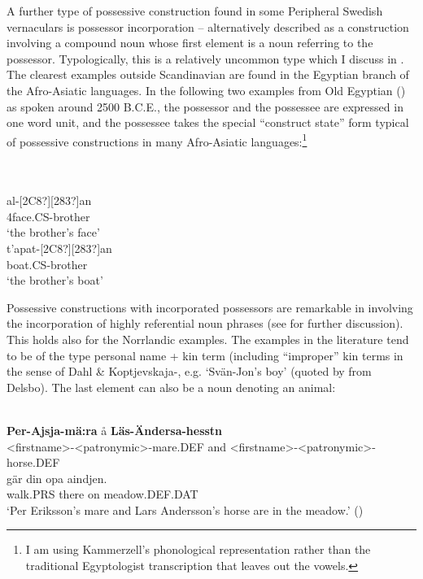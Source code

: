 A further type of possessive construction found in some Peripheral Swedish vernaculars is possessor incorporation – alternatively described as a construction involving a compound noun whose first element is a noun referring to the possessor. Typologically, this is a relatively uncommon type which I discuss in \citet{Dahl2004}. The clearest examples outside Scandinavian are found in the Egyptian branch of the Afro-Asiatic languages. In the following two examples from Old Egyptian (\citet{Kammerzell2000}) as spoken around 2500 B.C.E., the possessor and the possessee are expressed in one word unit, and the possessee takes the special “construct state” form typical of possessive constructions in many Afro-Asiatic languages:\footnote{ I am using Kammerzell’s phonological representation rather than the traditional Egyptologist transcription that leaves out the vowels.}

\ea
{}\\
\ea
{}\\
\gll [127?]al-[2C8?][283?]an\\
4face.CS-brother\\
\glt ‘the brother’s face’  
\ex
{}\\
\gll t’apat-[2C8?][283?]an\\
boat.CS-brother\\
\glt ‘the brother’s boat’
\z
\z

Possessive constructions with incorporated possessors are remarkable in involving the incorporation of highly referential noun phrases (see \citet{Dahl2004} for further discussion). This holds also for the Norrlandic examples. The examples in the literature tend to be of the type personal name + kin term (including “improper” kin terms in the sense of Dahl \& Koptjevskaja-\citet{Tamm2001}, e.g.  ‘Svän-Jon’s boy’ (quoted by \citet[38]{Delsing2003a} from Delsbo). The last element can also be a noun denoting an animal:

\ea\label{}
\\
\gll \textbf{Per-Ajsja-mä:ra} å  \textbf{Läs-Ändersa-hesstn}\\
{\textless}firstname{\textgreater}-{\textless}patronymic{\textgreater}-mare.DEF  and  {\textless}firstname{\textgreater}-{\textless}patronymic{\textgreater}-horse.DEF\\
\gll gär  din  opa  aindjen.\\
walk.PRS  there  on  meadow.DEF.DAT\\
\glt ‘Per Eriksson’s mare and Lars Andersson’s horse are in the meadow.’ (\citet[164]{Källskog1992})
\z


